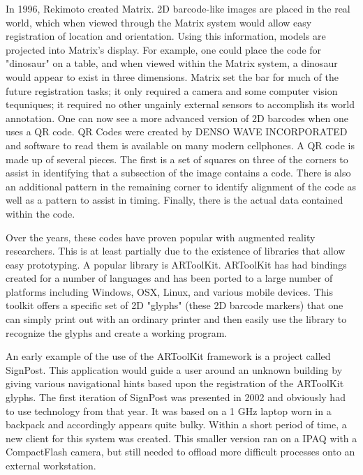 \documentclass{acm_proc_article-sp}
\begin{document}
In 1996, Rekimoto created Matrix. 2D barcode-like images are placed in the real world, which when viewed through the Matrix system would allow easy registration of location and orientation. Using this information, models are projected into Matrix's display.  For example, one could place the code for "dinosaur" on a table, and when viewed within the Matrix system, a dinosaur would appear to exist in three dimensions. Matrix set the bar for much of the future registration tasks; it only required a camera and some computer vision tequniques; it required no other ungainly external sensors to accomplish its world annotation.\cite{rekimoto2002matrix}  One can now see a more advanced version of 2D barcodes when one uses a QR code. QR Codes were created by DENSO WAVE INCORPORATED and software to read them is available on many modern cellphones. \cite{nojiri2004two}  A QR code is made up of several pieces.  The first is a set of squares on three of the corners to assist in identifying that a subsection of the image contains a code. There is also an additional pattern in the remaining corner to identify alignment of the code as well as a pattern to assist in timing.  Finally, there is the actual data contained within the code. \cite{ohbuchi2004barcode}

Over the years, these codes have proven popular with augmented reality researchers.  This is at least partially due to the existence of libraries that allow easy prototyping. A popular library is ARToolKit. \cite{kato1999marker}  ARToolKit has had bindings created for a number of languages and has been ported to a large number of platforms including Windows, OSX, Linux, and various mobile devices.  This toolkit offers a specific set of 2D "glyphs" (these 2D barcode markers) that one can simply print out with an ordinary printer and then easily use the library to recognize the glyphs and create a working program.  \cite{hornecker2005using}

An early example of the use of the ARToolKit framework is a project called SignPost. \cite{kalkusch2002structured}   This application would guide a user around an unknown building by giving various navigational hints based upon the registration of the ARToolKit glyphs.  The first iteration of SignPost was presented in 2002 and obviously had to use technology from that year. It was based on a 1 GHz laptop worn in a backpack and accordingly appears quite bulky.  Within a short period of time, a new client for this system was created.  This smaller version ran on a IPAQ with a CompactFlash camera, but still needed to offload more difficult processes onto an external workstation. \cite{wagner2003first}
\end{document}
